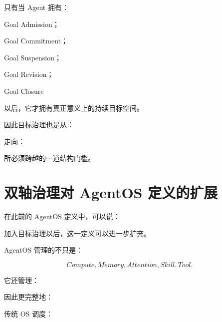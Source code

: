 只有当 Agent 拥有：

Goal Admission；

Goal Commitment；

Goal Suspension；

Goal Revision；

Goal Closure

以后，它才拥有真正意义上的持续目标空间。

因此目标治理也是从：

\begin{statementbox}
\centering
{}
\end{statementbox}

走向：

\begin{statementbox}
\centering
{}
\end{statementbox}

所必须跨越的一道结构门槛。


\section{双轴治理对 AgentOS 定义的扩展}

在此前的 AgentOS 定义中，可以说：

\begin{statementbox}
\centering
{}
\end{statementbox}

加入目标治理以后，这一定义可以进一步扩充。

AgentOS 管理的不只是：

\[
Compute,
Memory,
Attention,
Skill,
Tool.
\]

它还管理：

\begin{statementbox}
\centering
{}
\end{statementbox}

因此更完整地：

\begin{statementbox}
\centering
{}
\end{statementbox}

传统 OS 调度：

